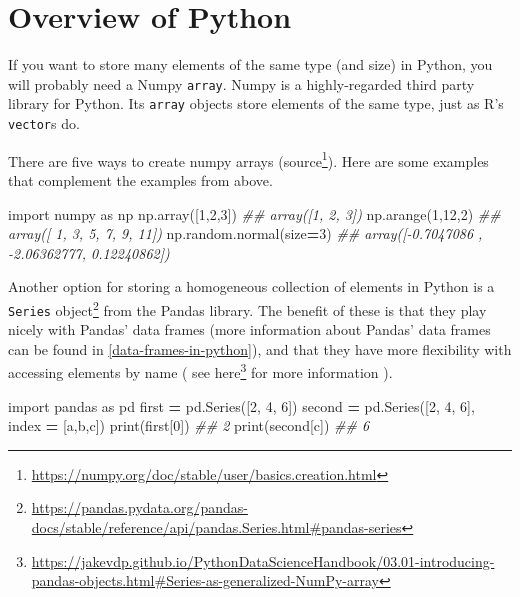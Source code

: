 \documentclass[
  12pt,
  krantz2]{krantz}
\makeatletter
\newenvironment{Shaded}{\begin{snugshade}}{\end{snugshade}}
\newcommand{\BuiltInTok}[1]{#1}
\newcommand{\CommentTok}[1]{\textcolor[rgb]{0.37,0.37,0.37}{\textit{#1}}}
\newcommand{\DecValTok}[1]{\textcolor[rgb]{0.06,0.06,0.06}{#1}}
\newcommand{\ImportTok}[1]{#1}
\newcommand{\NormalTok}[1]{#1}
\newcommand{\OperatorTok}[1]{\textcolor[rgb]{0.43,0.43,0.43}{\textbf{#1}}}
\newcommand{\StringTok}[1]{\textcolor[rgb]{0.5,0.5,0.5}{#1}}
\renewcommand{\href}[2]{#2\footnote{\url{#1}}}
\newenvironment{kframe}{%
\medskip{}
\setlength{\fboxsep}{.8em}
 \def\at@end@of@kframe{}%
 \ifinner\ifhmode%
  \def\at@end@of@kframe{\end{minipage}}%
  \begin{minipage}{\columnwidth}%
 \fi\fi%
 \def\FrameCommand##1{\hskip\@totalleftmargin \hskip-\fboxsep
 \colorbox{shadecolor}{##1}\hskip-\fboxsep
     \hskip-\linewidth \hskip-\@totalleftmargin \hskip\columnwidth}%
 \MakeFramed {\advance\hsize-\width
   \@totalleftmargin\z@ \linewidth\hsize
   \@setminipage}}%
 {\par\unskip\endMakeFramed%
 \at@end@of@kframe}
\renewenvironment{Shaded}{\begin{kframe}}{\end{kframe}}
\makeatother
\begin{document}
\hypertarget{overview-of-python}{%
\section{Overview of Python}\label{overview-of-python}}

If you want to store many elements of the same type (and size) in Python, you will probably need a Numpy \texttt{array}. Numpy is a highly-regarded third party library \citep{harris2020array} for Python. Its \texttt{array} objects store elements of the same type, just as R's \texttt{vector}s do.

There are five ways to create numpy arrays (\href{https://numpy.org/doc/stable/user/basics.creation.html}{source}). Here are some examples that complement the examples from above.

\begin{Shaded}
\begin{Highlighting}[]
\ImportTok{import}\NormalTok{ numpy }\ImportTok{as}\NormalTok{ np   }
\NormalTok{np.array([}\DecValTok{1}\NormalTok{,}\DecValTok{2}\NormalTok{,}\DecValTok{3}\NormalTok{])}
\CommentTok{\#\# array([1, 2, 3])}
\NormalTok{np.arange(}\DecValTok{1}\NormalTok{,}\DecValTok{12}\NormalTok{,}\DecValTok{2}\NormalTok{)}
\CommentTok{\#\# array([ 1,  3,  5,  7,  9, 11])}
\NormalTok{np.random.normal(size}\OperatorTok{=}\DecValTok{3}\NormalTok{)}
\CommentTok{\#\# array([{-}0.7047086 , {-}2.06362777,  0.12240862])}
\end{Highlighting}
\end{Shaded}

Another option for storing a homogeneous collection of elements in Python is a \href{https://pandas.pydata.org/pandas-docs/stable/reference/api/pandas.Series.html\#pandas-series}{\texttt{Series} object} from the Pandas library. The benefit of these is that they play nicely with Pandas' data frames (more information about Pandas' data frames can be found in \ref{data-frames-in-python}), and that they have more flexibility with accessing elements by name ( see \href{https://jakevdp.github.io/PythonDataScienceHandbook/03.01-introducing-pandas-objects.html\#Series-as-generalized-NumPy-array}{here} for more information ).

\begin{Shaded}
\begin{Highlighting}[]
\ImportTok{import}\NormalTok{ pandas }\ImportTok{as}\NormalTok{ pd}
\NormalTok{first }\OperatorTok{=}\NormalTok{ pd.Series([}\DecValTok{2}\NormalTok{, }\DecValTok{4}\NormalTok{, }\DecValTok{6}\NormalTok{])}
\NormalTok{second }\OperatorTok{=}\NormalTok{ pd.Series([}\DecValTok{2}\NormalTok{, }\DecValTok{4}\NormalTok{, }\DecValTok{6}\NormalTok{], index }\OperatorTok{=}\NormalTok{ [}\StringTok{\textquotesingle{}a\textquotesingle{}}\NormalTok{,}\StringTok{\textquotesingle{}b\textquotesingle{}}\NormalTok{,}\StringTok{\textquotesingle{}c\textquotesingle{}}\NormalTok{])}
\BuiltInTok{print}\NormalTok{(first[}\DecValTok{0}\NormalTok{])}
\CommentTok{\#\# 2}
\BuiltInTok{print}\NormalTok{(second[}\StringTok{\textquotesingle{}c\textquotesingle{}}\NormalTok{])}
\CommentTok{\#\# 6}
\end{Highlighting}
\end{Shaded}
\end{document}
